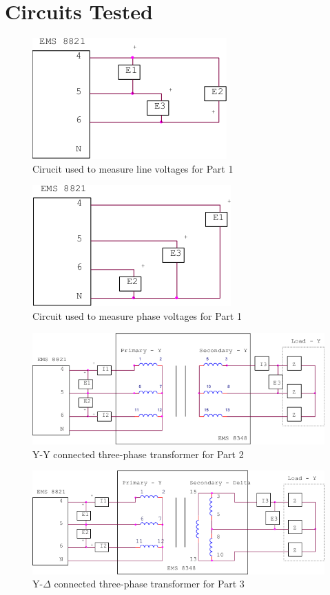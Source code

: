 \documentclass{article}
\begin{document}
\section*{Circuits Tested}
\begin{figure}[H]
  \centering
  \includegraphics[width=.8\textwidth]{img/circuit_01}
  \caption{Cirucit used to measure line voltages for Part 1}
  \label{fig:circuit_01}
\end{figure}

\begin{figure}[H]
  \centering
  \includegraphics[width=.8\textwidth]{img/circuit_02}
  \caption{Circuit used to measure phase voltages for Part 1}
  \label{fig:circuit_02}
\end{figure}

\begin{figure}[H]
  \centering
  \includegraphics[width=.8\textwidth]{img/circuit_03}
  \caption{Y-Y connected three-phase transformer for Part 2}
  \label{fig:circuit_03}
\end{figure}

\begin{figure}[H]
  \centering
  \includegraphics[width=.8\textwidth]{img/circuit_04}
  \caption{Y-$\Delta$ connected three-phase transformer for Part 3}
  \label{fig:circuit_04}
\end{figure}
\end{document}
